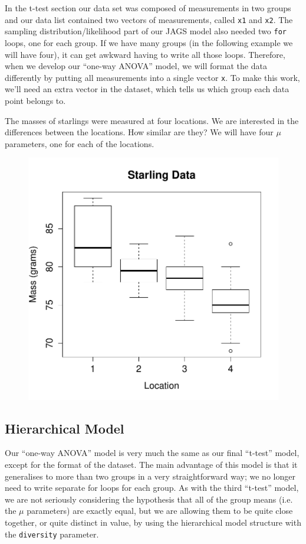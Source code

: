 In the t-test section our data set was composed of measurements in two groups
and our data list contained two vectors of measurements, called {\tt x1} and
{\tt x2}. The sampling distribution/likelihood part of our JAGS model also
needed two {\tt for} loops, one for each group.
If we have many groups (in the following example we will have four),
it can get awkward having to write all those loops. Therefore, when we develop
our ``one-way ANOVA'' model, we will format the data differently by putting
all measurements into a single vector {\tt x}. To make this work, we'll need
an extra vector in the dataset, which tells us which group each data point
belongs to.

The masses of starlings were measured at four locations. We are interested
in the differences between the locations. How similar are they? We will have
four $\mu$ parameters, one for each of the locations.

\begin{figure}[ht!]
\begin{center}
\includegraphics[scale=0.6]{Figures/starling.pdf}
\end{center}
\end{figure}


\subsection{Hierarchical Model}
Our ``one-way ANOVA'' model is very much the same as our final ``t-test'' model,
except for the format of the dataset.
The main advantage of this model is that it generalises to more than two groups
in a very straightforward way; we no longer need to write separate for loops
for each group. As with the third ``t-test'' model, we are not seriously
considering the hypothesis that all of the group means (i.e. the $\mu$
parameters) are exactly equal, but we are allowing them to be quite close
together, or quite distinct in value, by using the hierarchical model
structure with the {\tt diversity} parameter.

